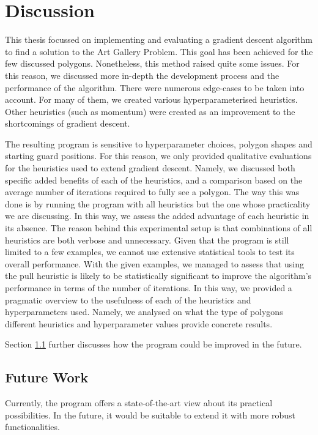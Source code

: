 \section{Discussion}
This thesis focussed on implementing and evaluating a gradient descent algorithm to find a solution to the Art Gallery Problem. This goal has been achieved for the few discussed polygons. 
Nonetheless, this method raised quite some issues. For this reason, we discussed more in-depth the development process and the performance of the algorithm. There were numerous edge-cases to be taken into account. For many of them, we created various hyperparameterised heuristics. Other heuristics (such as momentum) were created as an improvement to the shortcomings of gradient descent.

The resulting program is sensitive to hyperparameter choices, polygon shapes and starting guard positions. For this reason, we only provided qualitative evaluations for the heuristics used to extend gradient descent. Namely, we discussed both specific added benefits of each of the heuristics, and a comparison based on the average number of iterations required to fully see a polygon. The way this was done is by running the program with all heuristics but the one whose practicality we are discussing. In this way, we assess the added advantage of each heuristic in its absence. The reason behind this experimental setup is that combinations of all heuristics are both verbose and unnecessary. Given that the program is still limited to a few examples, we cannot use extensive statistical tools to test its overall performance. With the given examples, we managed to assess that using the pull heuristic is likely to be statistically significant to improve the algorithm's performance in terms of the number of iterations.
In this way, we provided a pragmatic overview to the usefulness of each of the heuristics and hyperparameters used. Namely, we analysed on what the type of polygons different heuristics and hyperparameter values provide concrete results.

Section \ref{sec:future} further discusses how the program could be improved in the future.




\subsection{Future Work}
\label{sec:future}
Currently, the program offers a state-of-the-art view about its practical possibilities.
In the future, it would be suitable to extend it with more robust functionalities.

